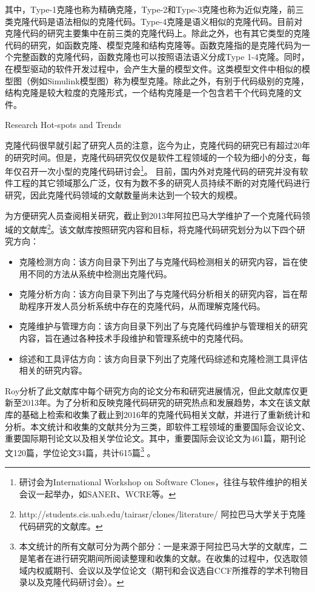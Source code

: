 其中，Type-1克隆也称为精确克隆，Type-2和Type-3克隆也称为近似克隆，前三类克隆代码是语法相似的克隆代码。Type-4克隆是语义相似的克隆代码。目前对克隆代码的研究主要集中在前三类的克隆代码上。除此之外，也有其它类型的克隆代码的研究，如函数克隆\cite{roy2008empirical}、模型克隆\cite{alalfi2012models}和结构克隆\cite{basit2009data,basit2005detecting}等。函数克隆指的是克隆代码为一个完整函数的克隆代码，函数克隆也可以按照语法语义分成Type 1-4克隆。同时，在模型驱动的软件开发过程中，会产生大量的模型文件。这类模型文件中相似的模型图（例如Simulink模型图）称为模型克隆。除此之外，有别于代码级别的克隆，结构克隆是较大粒度的克隆形式，一个结构克隆是一个包含若干个代码克隆的文件。

{Research Hot-spots and Trends}

克隆代码很早就引起了研究人员的注意，迄今为止，克隆代码的研究已有超过20年的研究时间。但是，克隆代码研究仅仅是软件工程领域的一个较为细小的分支，每年仅召开一次小型的克隆代码研讨会\footnote{研讨会为International Workshop on Software Clones，往往与软件维护的相关会议一起举办，如SANER、WCRE等。}。
目前，国内外对克隆代码的研究并没有软件工程的其它领域那么广泛，仅有为数不多的研究人员持续不断的对克隆代码进行研究，因此克隆代码领域的文献数量尚未达到一个较大的规模。

为方便研究人员查阅相关研究，截止到2013年阿拉巴马大学维护了一个克隆代码领域的文献库\footnote{ http://students.cis.uab.edu/tairasr/clones/literature/ 阿拉巴马大学关于克隆代码研究的文献库。}。该文献库按照研究内容和目标，将克隆代码研究划分为以下四个研究方向：

\begin{itemize}
\item 
克隆检测方向：该方向目录下列出了与克隆代码检测相关的研究内容，旨在使用不同的方法从系统中检测出克隆代码。
\item 
克隆分析方向：该方向目录下列出了与克隆代码分析相关的研究内容，旨在帮助程序开发人员分析系统中存在的克隆代码，从而理解克隆代码。
\item 
克隆维护与管理方向：该方向目录下列出了与克隆代码维护与管理相关的研究内容，旨在通过各种技术手段维护和管理系统中的克隆代码。
\item 
综述和工具评估方向：该方向目录下列出了克隆代码综述和克隆检测工具评估相关的研究内容。
\end{itemize}

Roy分析了此文献库中每个研究方向的论文分布和研究进展情况\cite{roy2014vision}，但此文献库仅更新至2013年。为了分析和反映克隆代码研究的研究热点和发展趋势，本文在该文献库的基础上检索和收集了截止到2016年的克隆代码相关文献，并进行了重新统计和分析。本文统计和收集的文献共分为三类，即软件工程领域的重要国际会议论文、重要国际期刊论文以及相关学位论文。其中，重要国际会议论文为461篇，期刊论文120篇，学位论文34篇，共计615篇\footnote{本文统计的所有文献可分为两个部分：一是来源于阿拉巴马大学的文献库，二是笔者在进行研究期间所阅读整理和收集的文献。在收集的过程中，仅选取领域内权威期刊、会议以及学位论文（期刊和会议选自CCF所推荐的学术刊物目录以及克隆代码研讨会）。} 。

